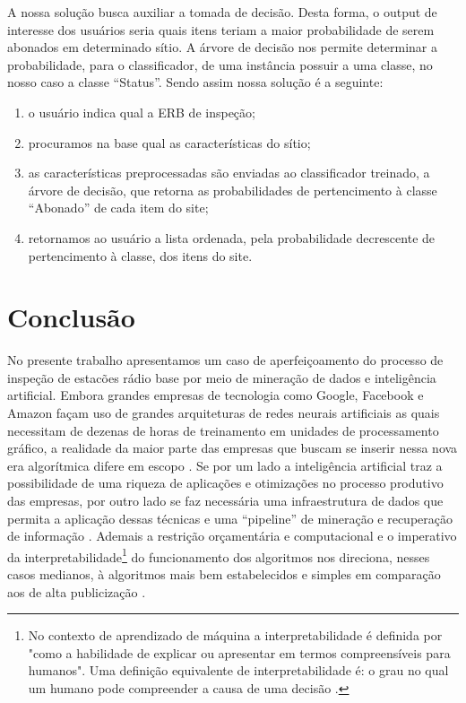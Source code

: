 \documentclass[
	12pt,				%
	openany,			%
	oneside,			%
	a4paper,			%
	english,			%
	french,				%
	spanish,			%
	brazil,				%
	]{abntex2}
\begin{document}
A nossa solu\c{c}ão busca auxiliar a tomada de decisão. Desta forma, o output de
interesse dos usuários seria quais itens teriam a maior probabilidade de serem
abonados em determinado sítio. A árvore de decisão nos permite determinar a
probabilidade, para o classificador, de uma instância possuir a uma classe, no
nosso caso a classe ``Status''. Sendo assim nossa solu\c{c}ão é a seguinte:
\begin{enumerate}
\item o usuário indica qual a ERB de inspe\c{c}ão;
\item procuramos na base qual as características do sítio;
\item as características preprocessadas são enviadas ao classificador treinado,
  a árvore de decisão, que retorna as probabilidades de pertencimento à classe
  ``Abonado'' de cada item do site;
  \item retornamos ao usuário a lista ordenada, pela probabilidade decrescente
    de pertencimento à classe, dos itens do site.
\end{enumerate}




\chapter*[Conclusão]{Conclusão}

No presente trabalho apresentamos um caso de aperfei\c{c}oamento do processo de
inspe\c{c}ão de esta{c}ões rádio base por meio de minera\c{c}ão de dados e
inteligência artificial. Embora grandes empresas de tecnologia como Google,
Facebook e Amazon façam uso de grandes arquiteturas de redes neurais artificiais
as quais necessitam de dezenas de horas de treinamento em unidades de
processamento gráfico, a realidade da maior parte das empresas que buscam se
inserir nessa nova era algorítmica difere em escopo \cite{canziani2016analysis}.
Se por um lado a inteligência artificial traz a possibilidade de uma riqueza de
aplicações e otimizações no processo produtivo das empresas, por outro lado se
faz necessária uma infraestrutura de dados que permita a aplicação dessas
técnicas e uma ``pipeline'' de mineração e recuperação de informação
\cite{schutze2007introduction}. Ademais a restrição orçamentária e computacional
e o imperativo da interpretabilidade\footnote{No contexto de aprendizado de
  máquina a interpretabilidade é definida por 
  "como a habilidade de explicar ou apresentar em termos compreensíveis para
  humanos". Uma definição equivalente de interpretabilidade é: o grau no qual um
  humano pode compreender a causa de uma decisão \cite{miller2018explanation}.}
do funcionamento dos algoritmos nos direciona, nesses casos medianos, à
algoritmos mais bem estabelecidos e simples em comparação aos de alta
publicização \cite{dreiseitl2002logistic}.
\end{document}
